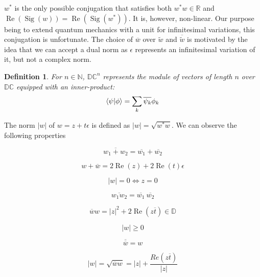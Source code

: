 \documentclass{article}
\newtheorem{definition}[theorem]{Definition}
\newcommand{\N}{\mathbb{N}}
\newcommand{\R}{\mathbb{R}}
\newcommand{\D}{\mathbb{D}}
\newcommand{\DC}{\mathbb{DC}}
\newcommand{\e}{\epsilon}
\newcommand{\til}{\widetilde}
\renewcommand{\bar}{\overline}
\renewcommand{\Re}{\operatorname{Re}}
\newcommand{\Sig}{\operatorname{Sig}}
\begin{document}
$w^*$ is the only possible conjugation that satisfies both $w^*w \in \R$ and $\Re(\Sig(w)) = \Re(\Sig(w^*))$. It is, however, non-linear. Our purpose being to extend quantum mechanics with a unit for infinitesimal variations, this conjugation is unfortunate. The choice of $\bar{w}$ over $\til{w}$ and $\bar{\til{w}}$ is motivated by the idea that we can accept a dual norm as $\e$ represents an infinitesimal variation of it, but not a complex norm.

\begin{definition}
For $n \in \N$, $\DC^n$ represents the module of vectors of length $n$ over $\DC$ equipped with an inner-product:
\begin{equation}
 \braket{\psi|\phi} = \sum_k \bar{\psi_k}\phi_k
\end{equation}

\end{definition}

The norm $|w|$ of $w = z + t\e$ is defined as $|w| = \sqrt{w^* w}$. We can observe the following properties

\begin{multicols}{3}
\noindent \begin{equation}
\bar{w_1 + w_2} = \bar{w_1} + \bar{w_2}
\end{equation}

\noindent \begin{equation}
w + \bar{w} = 2 \Re(z) + 2 \Re(t) \e
\end{equation}

\noindent \begin{equation}\label{eq:eq0}
|w| = 0 \iff z = 0
\end{equation}

\columnbreak

\noindent \begin{equation}
\bar{w_1  w_2} = \bar{w_1} ~ \bar{w_2}
\end{equation}

\noindent \begin{equation}\label{eq:sqnorm}
\bar{w}w = |z|^2 + 2 \Re(z\bar{t}) \in \D
\end{equation}

\noindent \begin{equation}\label{eq:geq0}
|w| \geq 0
\end{equation}

\columnbreak

\noindent \begin{equation}
\bar{\bar{w}} = w
\end{equation}

\noindent \begin{equation}\label{eq:modul}
|w| = \sqrt{\bar{w}w} = |z| + \frac{Re(z\bar{t})}{|z|}
\end{equation}

\end{multicols}
\end{document}
